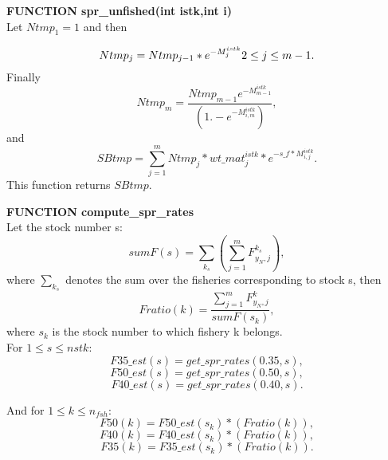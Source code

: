 \documentclass{article}
\begin{document}
\textbf{FUNCTION spr\_unfished(int istk,int i)}\\
Let $Ntmp_1=1$ and then 

\begin{equation*}
    Ntmp_j=Ntmp_{j-1}*e^{-M^{istk}_j} \\ 2 \leq j \leq m-1.
\end{equation*}
Finally
\begin{equation}
    Ntmp_m=\dfrac{Ntmp_{m-1}e^{-M^{istk}_{m-1}}}{(1.-e^{-M^{istk}_{i,m}})},
\end{equation}
and
\begin{equation}
    SBtmp=\sum_{j=1}^{m}Ntmp_j*wt\_mat_j^{istk}*e^{-s\_f * M^{istk}_{i,j}}.
\end{equation}
This function returns $SBtmp$.

\textbf{FUNCTION compute\_spr\_rates}\\

Let the stock number s:
\begin{equation}
    sumF(s)=\sum_{k_s}\left(\sum_{j=1}^mF^{k_s}_{y_N, j}\right),
\end{equation}
where $\sum_{k_s}$ denotes the sum over the fisheries corresponding to stock s, then
\begin{equation}
    Fratio(k)=\dfrac{\sum_{j=1}^mF^k_{y_N,j}}{sumF(s_k)},
\end{equation}
where $s_k$ is the stock number to which fishery k belongs.\\

For $1\leq s \leq nstk$:
 \begin{equation}
        F35\_est(s) = get\_spr\_rates(0.35,s),
    \end{equation}
     \begin{equation}
        F50\_est(s) = get\_spr\_rates(0.50,s),
    \end{equation}
     \begin{equation}
        F40\_est(s) = get\_spr\_rates(0.40,s).
    \end{equation}

And for $1\leq k \leq n_{fsh}$:
\begin{equation}
        F50(k) = F50\_est(s_k) * (Fratio(k)),
    \end{equation}
\begin{equation}
        F40(k) = F40\_est(s_k) * (Fratio(k)),
    \end{equation}
\begin{equation}
        F35(k) = F35\_est(s_k) * (Fratio(k)).
    \end{equation}
\end{document}
